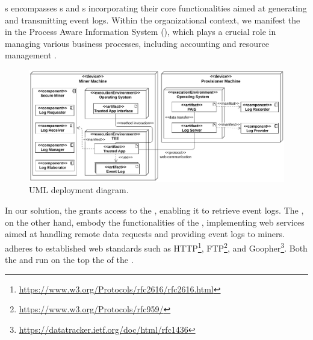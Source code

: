 s encompasses s and s incorporating their core functionalities aimed at generating and transmitting event logs. Within the organizational context, we manifest the  in the Process Aware Information System (), which plays a crucial role in managing various business processes, including accounting and resource management \cite{Dumas.etal/2018:FundamentalsofBPM}.
\begin{figure}[t]
	\centering
	\includegraphics[width=1\linewidth]{content/figures/deploymentdiagram3.pdf}
	\caption{UML deployment diagram.}
	\label{fig:deployment_diagram}
\end{figure}
In our solution, the  grants access to the , enabling it to retrieve event logs. The , on the other hand, embody the functionalities of the , implementing web services aimed at handling remote data requests and providing event logs to miners.  adheres to established web standards such as HTTP\footnote{\url{https://www.w3.org/Protocols/rfc2616/rfc2616.html}}, FTP\footnote{\url{https://www.w3.org/Protocols/rfc959/}}, and Goopher\footnote{\url{https://datatracker.ietf.org/doc/html/rfc1436}}. Both the  and  run on the top the  of the .



